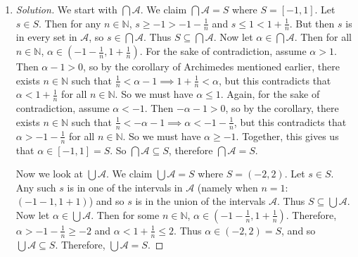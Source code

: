\documentclass{article}
\newcommand{\N}{{\mathbb N}}
\newcommand{\ep}{{\varepsilon}}
\begin{document}
\begin{enumerate}
\begin{proof}[Solution]
	Now we look at $\bigcup \mathcal{A}$.
	We claim $\bigcup \mathcal{A} = S$ where $S = (0,1)$.
	We make use of the corollary of the Archimedian property:
	$\forall \ep > 0$, $\exists n\in\N$ such that $\frac{1}{n} < \ep$
	(from week 3 notes).
	Let $s \in S$.
	Then by the corollary, $\exists n_1\in\N$ such that $s > \frac{1}{n_1}$ (since $s$ is positive).
	Now note that $s < 1$, so $1-s > 0$.
	Thus, by the corollary,
	there exists $n_2$ such that $\frac{1}{n_2} < 1 - s$ or $s < 1 - \frac{1}{n_2}$.
	Let $n = \max\{n_1,n_2,2\}$.
	Note that the inequalities still hold,
	since if $n > n'$, then $s > \frac{1}{n'} \geq \frac{1}{n}$
	and $s < 1-\frac{1}{n'} \leq 1-\frac{1}{n}$.
	Thus, since we have some $2 \leq n \in \N$ such that $\frac{1}{n} < s < 1-\frac{1}{n}$.
	Then $s \in [\frac{1}{n}, 1-\frac{1}{n}]$, thus $s \in \bigcup \mathcal{A}$.
	Thus $S \subseteq \bigcup \mathcal{A}$.
	Now let $\alpha \in \bigcup \mathcal{A}$.
	Then for some $2 \leq n \in \N$, $\alpha \in [\frac{1}{n}, 1-\frac{1}{n}]$.
	Therefore $\alpha \geq \frac{1}{n} > 0$ and $\alpha \leq 1-\frac{1}{n} < 1$,
	thus $\alpha \in (0,1) = S$.
	Finally, this means $\bigcup \mathcal{A} \subseteq S$, so $S = \bigcup \mathcal{A}$.
\end{proof}
\item \begin{proof}[Solution]\let\qed\relax
	We start with $\bigcap \mathcal{A}$.
	We claim $\bigcap \mathcal{A} = S$ where $S = [-1,1]$.
	Let $s \in S$.
	Then for any $n \in \N$, $s \geq -1 > -1-\frac{1}{n}$ and $s \leq 1 <1+\frac{1}{n}$.
	But then $s$ is in every set in $\mathcal{A}$,
	so $s \in \bigcap \mathcal{A}$.
	Thus $S \subseteq \bigcap\mathcal{A}$.
	Now let $\alpha \in \bigcap \mathcal{A}$.
	Then for all $n \in \N$, $\alpha \in (-1-\frac{1}{n}, 1+\frac{1}{n})$.
	For the sake of contradiction, assume $\alpha > 1$.
	Then $\alpha - 1 > 0$, so by the corollary of Archimedes mentioned earlier,
	there exists $n \in \N$ such that $\frac{1}{n} < \alpha - 1 \implies
	1 + \frac{1}{n} < \alpha$,
	but this contradicts that $\alpha < 1 + \frac{1}{n}$ for all $n\in\N$.
	So we must have $\alpha \leq 1$.
	Again, for the sake of contradiction, assume $\alpha < -1$.
	Then $-\alpha - 1 > 0$, so by the corollary,
	there exists $n \in \N$ such that $\frac{1}{n} < -\alpha - 1
	\implies \alpha < -1 -\frac{1}{n}$,
	but this contradicts that $\alpha > -1-\frac{1}{n}$ for all $n \in \N$.
	So we must have $\alpha \geq -1$.
	Together, this gives us that $\alpha \in [-1,1] = S$.
	So $\bigcap\mathcal{A} \subseteq S$,
	therefore $\bigcap\mathcal{A} = S$.

	Now we look at $\bigcup \mathcal{A}$.
	We claim $\bigcup \mathcal{A} = S$ where $S = (-2, 2)$.
	Let $s \in S$.
	Any such $s$ is in one of the intervals in $\mathcal{A}$
	(namely when $n=1$: $(-1-1,1+1)$)
	and so $s$ is in the union of the intervals $\mathcal{A}$.
	Thus $S \subseteq \bigcup\mathcal{A}$.
	Now let $\alpha \in \bigcup \mathcal{A}$.
	Then for some $n\in\N$, $\alpha \in (-1-\frac{1}{n}, 1+\frac{1}{n})$.
	Therefore, $\alpha > -1-\frac{1}{n} \geq -2$ and $\alpha < 1 + \frac{1}{n} \leq 2$.
	Thus $\alpha \in (-2,2) = S$, and so $\bigcup \mathcal{A} \subseteq S$.
	Therefore, $\bigcup \mathcal{A} = S$.
\end{proof}
\end{enumerate}
\end{document}
